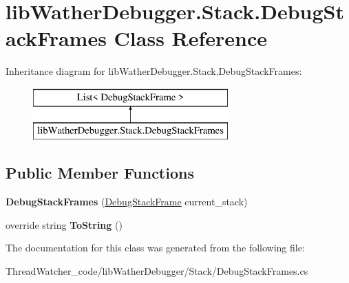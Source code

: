 \hypertarget{classlib_wather_debugger_1_1_stack_1_1_debug_stack_frames}{\section{lib\+Wather\+Debugger.\+Stack.\+Debug\+Stack\+Frames Class Reference}
\label{classlib_wather_debugger_1_1_stack_1_1_debug_stack_frames}
}
Inheritance diagram for lib\+Wather\+Debugger.\+Stack.\+Debug\+Stack\+Frames\+:\begin{figure}[H]
\begin{center}
\leavevmode
\includegraphics[height=2.000000cm]{classlib_wather_debugger_1_1_stack_1_1_debug_stack_frames}
\end{center}
\end{figure}
\subsection*{Public Member Functions}
\begin{DoxyCompactItemize}
\item 
\hypertarget{classlib_wather_debugger_1_1_stack_1_1_debug_stack_frames_a25d2ee5359fea1c8e4b704c4c19f794e}{{\bfseries Debug\+Stack\+Frames} (\hyperlink{classlib_wather_debugger_1_1_stack_1_1_debug_stack_frame}{Debug\+Stack\+Frame} current\+\_\+stack)}\label{classlib_wather_debugger_1_1_stack_1_1_debug_stack_frames_a25d2ee5359fea1c8e4b704c4c19f794e}

\item 
\hypertarget{classlib_wather_debugger_1_1_stack_1_1_debug_stack_frames_a9f8ba742dc81626068ea68aebe918f95}{override string {\bfseries To\+String} ()}\label{classlib_wather_debugger_1_1_stack_1_1_debug_stack_frames_a9f8ba742dc81626068ea68aebe918f95}

\end{DoxyCompactItemize}


The documentation for this class was generated from the following file\+:\begin{DoxyCompactItemize}
\item 
Thread\+Watcher\+\_\+code/lib\+Wather\+Debugger/\+Stack/Debug\+Stack\+Frames.\+cs\end{DoxyCompactItemize}
